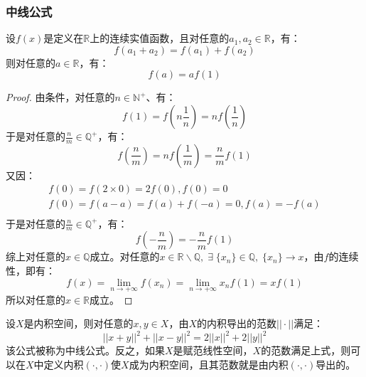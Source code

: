 \subsubsection{中线公式}
\begin{lemma}\label{lemma:continuous+additive=homogeneous}
	设$f(x)$是定义在$\mathbb{R}$上的连续实值函数，且对任意的$a_1,a_2\in\mathbb{R}$，有：
	\begin{equation*}
		f(a_1+a_2)=f(a_1)+f(a_2)
	\end{equation*}
	则对任意的$a\in\mathbb{R}$，有：
	\begin{equation*}
		f(a)=af(1)
	\end{equation*}
\end{lemma}
\begin{proof}
	由条件，对任意的$n\in\mathbb{N}^+$、有：
	\begin{equation*}
		f(1)=f\left(n\frac{1}{n}\right)=nf\left(\frac{1}{n}\right)
	\end{equation*}
	于是对任意的$\frac{n}{m}\in\mathbb{Q^+}$，有：
	\begin{equation*}
		f\left(\frac{n}{m}\right)=nf\left(\frac{1}{m}\right)=\frac{n}{m}f(1)
	\end{equation*}
	又因：
	\begin{gather*}
		f(0)=f(2\times0)=2f(0),f(0)=0 \\
		f(0)=f(a-a)=f(a)+f(-a)=0,f(a)=-f(a) \\
	\end{gather*}
	于是对任意的$\frac{n}{m}\in\mathbb{Q^+}$，有：
	\begin{equation*}
		f(-\frac{n}{m})=-\frac{n}{m}f(1)
	\end{equation*}
	综上对任意的$x\in\mathbb{Q}$成立。对任意的$x\in\mathbb{R}\backslash\mathbb{Q},\;\exists\;\{x_n\}\in\mathbb{Q},\;\{x_n\}\rightarrow x$，由$f$的连续性，即有：
	\begin{equation*}
		f(x)=\lim_{n\to+\infty}f(x_n)=\lim_{n\to+\infty}x_nf(1)=xf(1)
	\end{equation*}
	所以对任意的$x\in\mathbb{R}$成立。
\end{proof}
\begin{theorem}[中线公式]
	设$X$是内积空间，则对任意的$x,y\in X$，由$X$的内积导出的范数$||\cdot||$满足：
	\begin{equation*}
		||x+y||^2+||x-y||^2=2||x||^2+2||y||^2
	\end{equation*}
	该公式被称为中线公式。反之，如果$X$是赋范线性空间，$X$的范数满足上式，则可以在$X$中定义内积$(\cdot,\cdot)$使$X$成为内积空间，且其范数就是由内积$(\cdot,\cdot)$导出的。
\end{theorem}
